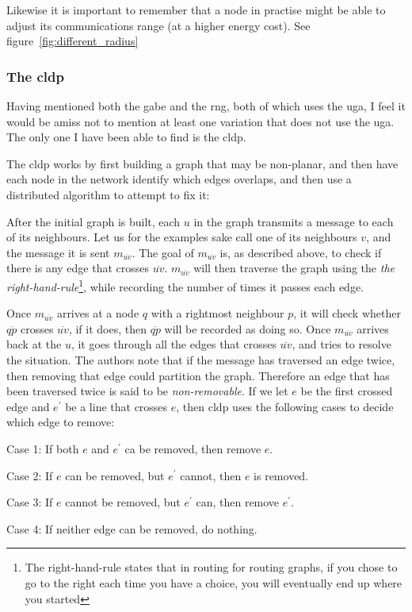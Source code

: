 Likewise it is important to remember that a node in practise might be able to adjust its communications range (at a higher energy cost). See figure~\ref{fig:different_radius}

\subsubsection{The \ac{cldp}}
Having mentioned both the \ac{gabe} and the \ac{rng}, both of which uses the \ac{uga}, I feel it would be amiss not to mention at least one variation that does not use the \ac{uga}. The only one I have been able to find is the \ac{cldp}.
 
The \ac{cldp} works by first building a graph that may be non-planar, and then have each node in the network identify which edges overlaps, and then use a distributed algorithm to attempt to fix it:

After the initial graph is built, each $u$ in the graph transmits a message to each of its neighbours. Let us for the examples sake call one of its neighbours $v$, and the message it is sent $m_{\overline{uv}}$. The goal of $m_{\overline{uv}}$ is, as described above, to check if there is any edge that crosses $\overline{uv}$. $m_{\overline{uv}}$ will then traverse the graph using the \label{right-hand-rule} \emph{the right-hand-rule}\footnote{The right-hand-rule states that in routing for routing graphs, if you chose to go to the right each time you have a choice, you will eventually end up where you started}, while recording the number of times it passes each edge.

Once $m_{\overline{uv}}$ arrives at a node $q$ with a rightmost neighbour $p$, it will check whether $\overline{qp}$ crosses $\overline{uv}$, if it does, then $\overline{qp}$ will be recorded as doing so. Once $m_{\overline{uv}}$ arrives back at the $u$, it goes through all the edges that crosses $\overline{uv}$, and tries to resolve the situation. The authors note that if the message has traversed an edge twice, then removing that edge could partition the graph. Therefore an edge that has been traversed twice is said to be \emph{non-removable}. If we let $e$ be the first crossed edge and $e^{\prime}$ be a line that crosses $e$, then \ac{cldp} uses the following cases to decide which edge to remove:
\begin{description}
\item{Case 1:} If both $e$ and $e^{\prime}$ ca be removed, then remove $e$.
\item{Case 2:} If $e$ can be removed, but $e^{\prime}$ cannot, then $e$ is removed.
\item{Case 3:} If $e$ cannot be removed, but $e^{\prime}$ can, then remove $e^{\prime}$.
\item{Case 4:} If neither edge can be removed, do nothing. 
\end{description}


